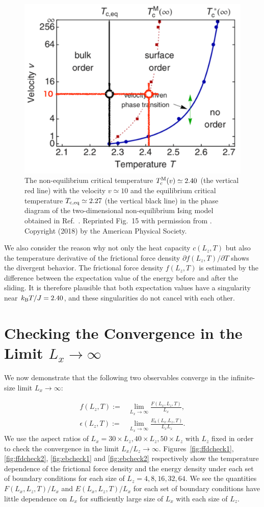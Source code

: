 \begin{figure}[htbp]
	\centering
	\includegraphics[width=0.5\linewidth]{NEPTIsing_.pdf}
	\caption{The non-equilibrium critical temperature $T^{\rm M}_{\rm c}(v)\simeq 2.40$ (the vertical red line) with the velocity $v\simeq 10$ and the equilibrium critical temperature $T_{\rm c, eq}\simeq 2.27$ (the vertical black line) in the phase diagram of the two-dimensional non-equilibrium Ising model obtained in Ref.~\cite{Hucht2009b}. Reprinted Fig.~15 with permission from . Copyright (2018) by the American Physical Society.}
	\label{fig:NEPTinIsing_}
\end{figure}

We also consider the reason why not only the heat capacity $c(L_{z}, T)$ but also the temperature derivative of the frictional force density $\partial f(L_{z}, T)/\partial T$ shows the divergent behavior. The frictional force density $f(L_{z}, T)$ is estimated by the difference between the expectation value of the energy before and after the sliding. It is therefore plausible that both expectation values have a singularity near $k_{\rm B}T/J=2.40$, and these singularities do not cancel with each other.

\section{Checking the Convergence in the Limit $L_{x}\to\infty$}
\label{sec:convcheck}

We now demonstrate that the following two observables converge in the infinite-size limit $L_{x}\to\infty$:

\begin{align}
f(L_{z}, T):=&\lim_{L_{x}\to\infty}\frac{F(L_{x}, L_{z}, T)}{L_{x}},\\
\epsilon(L_{z}, T):=&\lim_{L_{x}\to\infty}\frac{E_{b}(L_{x}. L_{z}, T)}{L_{x}L_{z}}.
\end{align}
We use the aspect ratios of $L_{x}=30\times L_{z}, 40\times L_{z}, 50\times L_{z}$ with $L_{z}$ fixed in order to check the convergence in the limit $L_{x}/L_{z}\to\infty$. Figures~\ref{fig:ffdcheck1}, \ref{fig:ffdcheck2}, \ref{fig:ebcheck1} and \ref{fig:ebcheck2} respectively show the temperature dependence of the frictional force density and the energy density under each set of boundary conditions for each size of $L_{z} = 4, 8, 16, 32, 64$. We see the quantities $F(L_{x}, L_{z}, T)/L_{x}$ and $E(L_{x}, L_{z}, T)/L_{x}$ for each set of boundary conditions have little dependence on $L_{x}$ for sufficiently large size of $L_{x}$ with each size of $L_{z}$.

